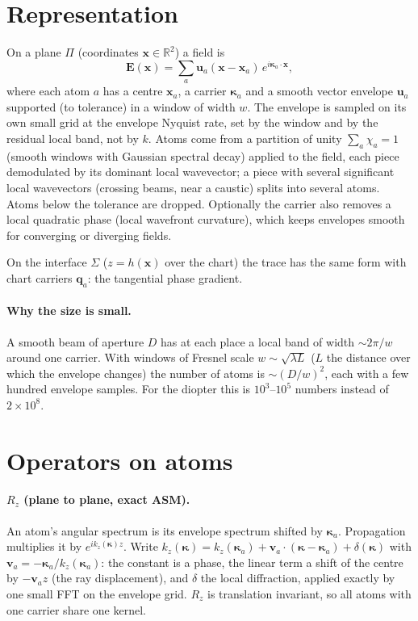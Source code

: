 \documentclass[11pt,a4paper]{article}
\newcommand{\ve}[1]{\bm{#1}}
\newcommand{\kp}{\boldsymbol\kappa}
\begin{document}
\section{Representation}
On a plane $\Pi$ (coordinates $\ve x\in\mathbb R^2$) a field is
\begin{equation}
 \ve E(\ve x)=\sum_a \ve u_a(\ve x-\ve x_a)\,e^{i\kp_a\cdot\ve x},
 \label{eq:atoms}
\end{equation}
where each atom $a$ has a centre $\ve x_a$, a carrier $\kp_a$ and a smooth
vector envelope $\ve u_a$ supported (to tolerance) in a window of width $w$.
The envelope is sampled on its own small grid at the envelope Nyquist rate,
set by the window and by the residual local band, not by $k$. Atoms come from
a partition of unity $\sum_a\chi_a=1$ (smooth windows with Gaussian spectral
decay) applied to the field, each piece demodulated by its dominant local
wavevector; a piece with several significant local wavevectors (crossing
beams, near a caustic) splits into several atoms. Atoms below the tolerance
are dropped. Optionally the carrier also removes a local quadratic phase
(local wavefront curvature), which keeps envelopes smooth for converging or
diverging fields.

On the interface $\Sigma$ ($z=h(\ve x)$ over the chart) the trace has the same
form with chart carriers $\ve q_a$: the tangential phase gradient.

\paragraph{Why the size is small.} A smooth beam of aperture $D$ has at each
place a local band of width $\sim2\pi/w$ around one carrier. With windows of
Fresnel scale $w\sim\sqrt{\lambda L}$ ($L$ the distance over which the
envelope changes) the number of atoms is $\sim(D/w)^2$, each with a few hundred
envelope samples. For the diopter this is $10^3$--$10^5$ numbers instead of
$2\times10^8$.

\section{Operators on atoms}
\paragraph{$R_z$ (plane to plane, exact ASM).} An atom's angular spectrum is
its envelope spectrum shifted by $\kp_a$. Propagation multiplies it by
$e^{ik_z(\kp)z}$. Write
$k_z(\kp)=k_z(\kp_a)+\ve v_a\cdot(\kp-\kp_a)+\delta(\kp)$ with
$\ve v_a=-\kp_a/k_z(\kp_a)$: the constant is a phase, the linear term a shift
of the centre by $-\ve v_a z$ (the ray displacement), and $\delta$ the local
diffraction, applied exactly by one small FFT on the envelope grid. $R_z$ is
translation invariant, so all atoms with one carrier share one kernel.
\end{document}
